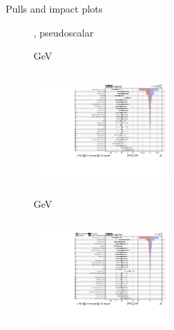 \documentclass[8pt]{beamer}
\begin{document}
\begin{frame}{Pulls and impact plots}
\justifying
\begin{figure}[htbp]
\centering
\begin{block}{, pseudoscalar}\end{block}	\vspace{-8pt}

\begin{minipage}[b]{0.49\textwidth}
\begin{center}
\centering \begin{block}{ GeV}\end{block}	
\includegraphics[width=5.1cm, height=4.2cm]{figs/impacts_2018_both_pseudo_100.pdf}
\end{center}
\end{minipage}\hfill
\begin{minipage}[b]{0.49\textwidth}
\begin{center}
\centering \begin{block}{ GeV}\end{block}	
\includegraphics[width=5.1cm, height=4.2cm]{figs/impacts_2018_both_pseudo_500.pdf}
\end{center}
\end{minipage} \hfill
\end{figure}
\end{frame}
\end{document}
